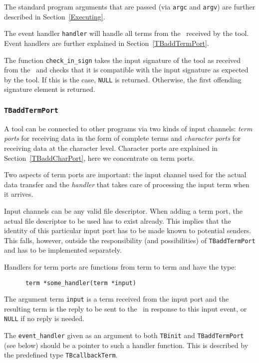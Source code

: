 The standard program arguments that are passed (via  {\tt argc} and {\tt argv})
are further described in Section~\ref{Executing}.

The event handler {\tt handler} will handle all terms
from the \TB\  received by the tool. Event handlers are further explained
in Section~\ref{TBaddTermPort}.

The function {\tt check\_in\_sign} takes the input signature of the
tool as received from the \TB\ and checks that it is compatible with
the input signature as expected by the tool.  If this is the case,
{\tt NULL} is returned.  Otherwise, the first offending
signature element is returned.

\subsubsection{\label{TBaddTermPort}{\tt TBaddTermPort}}

A tool can be connected to other programs via two kinds of input channels:
{\em term ports} for receiving data in the form of complete
terms  and {\em character ports} for receiving data at the character level.
Character ports are explained in Section~\ref{TBaddCharPort}, here we concentrate on
term ports.

Two aspects of term ports are important: the input channel used for
the actual data transfer and the {\em handler} that takes care of processing
the input term when it arrives.

Input channels can be any valid file descriptor.  When adding a term
port, the actual file descriptor to be used has to exist already.
This implies that the identity of this particular input port has to be
made known to potential senders. This falls, however,
outside the responsibility (and possibilities) of {\tt TBaddTermPort}
and has to be implemented separately.

Handlers for term ports are functions from term to term and have the
type:
\begin{verbatim}
      term *some_handler(term *input)
\end{verbatim}
The argument term {\tt input} is a term received from the input port
and the resulting term is the reply to be sent  to the \TB\ in response
to this input event, or {\tt NULL} if no reply is needed.

The {\tt event\_handler} given as an argument to both {\tt TBinit} and
{\tt TBaddTermPort} (see below) should be a pointer to such a handler function.
This is described by the predefined type {\tt TBcallbackTerm}.

